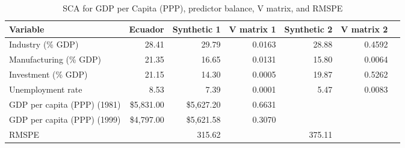 \begin{table}[!htbp]
\begin{center}
\caption{SCA for GDP per Capita (PPP), predictor balance, V matrix, and RMSPE} \label{table:GDP_balance}
\begin{tabular}{l r r r r r r}     \\ \toprule
  Variable                    &    Ecuador &  Synthetic 1 & V matrix 1 & Synthetic 2 & V matrix 2 \\ \midrule 
  Industry (\% GDP)           &      28.41 &        29.79 &     0.0163 &       28.88 &     0.4592 \\
  Manufacturing (\% GDP)      &      21.35 &        16.65 &     0.0131 &       15.80 &     0.0064 \\
  Investment (\% GDP)         &      21.15 &        14.30 &     0.0005 &       19.87 &     0.5262 \\
  Unemployment rate           &       8.53 &         7.39 &     0.0001 &        5.47 &     0.0083 \\ \midrule
  GDP per capita (PPP) (1981) & \$5,831.00 &   \$5,627.20 &     0.6631 &             &            \\
  GDP per capita (PPP) (1999) & \$4,797.00 &   \$5,621.58 &     0.3070 &             &            \\ \midrule
  RMSPE                       &            &       315.62 &            &      375.11 &            \\
  \bottomrule 
\end{tabular}
\end{center}
\end{table}